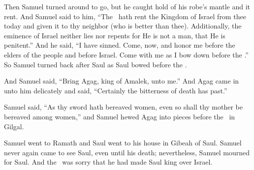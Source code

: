 \begin{inparaenum}
   Then Samuel turned around to go, but he caught hold of his robe's mantle and it rent.%
   And Samuel said to him, ``The \lord\ hath rent the Kingdom of Israel from thee today and given it to thy neighbor (who is better than thee).%
   Additionally, the eminence of Israel neither lies nor repents for He is not a man, that He is penitent.''%
   And he said, ``I have sinned. Come, now, and honor me before the elders of the people and before Israel. Come with me as I bow down before the \lord.''%
   So Samuel turned back after Saul as Saul bowed before the \lord.%
  
   And Samuel said, ``Bring Agag, king of Amalek, unto me.'' And Agag came in unto him delicately and said, ``Certainly the bitterness of death has past.''%
  
   Samuel said, ``As thy sword hath bereaved women, even so shall thy mother be bereaved among women,'' and Samuel hewed Agag into pieces before the \lord\ in Gilgal.%
  
   Samuel went to Ramath and Saul went to his house in Gibeah of Saul.%
   Samuel never again came to see Saul, even until his death; nevertheless, Samuel mourned for Saul. And the \lord\ was sorry that he had made Saul king over Israel.%
\end{inparaenum}
